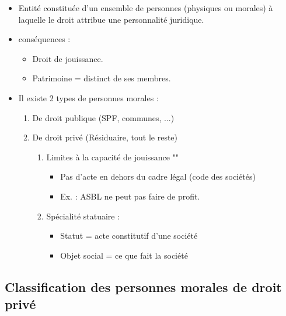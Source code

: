 \begin{itemize}
    \item Entité constituée d'un ensemble de personnes (physiques ou morales) à laquelle le droit attribue une personnalité juridique.
    \item conséquences :
    \begin{itemize}
        \item Droit de jouissance.
        \item Patrimoine  = distinct de ses membres.
    \end{itemize}
    \item Il existe 2 types de personnes morales :
    \begin{enumerate}
        \item De droit publique (SPF, communes, ...)
        \item De droit privé (Résiduaire, tout le reste)
        \begin{enumerate}
            \item Limites à la capacité de jouissance ""
            \begin{itemize}
                \item Pas d'acte en dehors du cadre légal (code des sociétés)
                \item Ex. : ASBL ne peut pas faire de profit.
            \end{itemize}
            \item Spécialité statuaire : 
            \begin{itemize}
                \item Statut = acte constitutif d'une société
                \item Objet social = ce que fait la société
            \end{itemize}
        \end{enumerate}
    \end{enumerate}
\end{itemize}

\subsection{Classification des personnes morales de droit privé}


